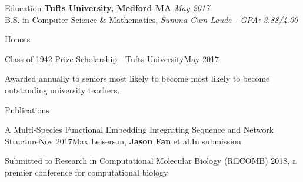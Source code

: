 \documentclass{resume}
\begin{document}
  \begin{rSection}{Education}
    {\bf Tufts University, Medford MA} \hfill {\em May 2017} \\ 
    { B.S. in Computer Science \& Mathematics, \textit{Summa Cum Laude -  GPA: 3.88/4.00}}
  \end{rSection}

  \begin{rSection}{Honors} 
  \begin{rSubsection}{Class of 1942 Prize Scholarship - Tufts University}{May 2017}{}{}
  \item Awarded annually to seniors most likely to become most
likely to become outstanding university teachers.
  \end{rSubsection}
  \end{rSection}

  \begin{rSection}{Publications}
  \begin{rSubsection}{A Multi-Species Functional Embedding Integrating Sequence and Network Structure}{Nov 2017}{Max Leiserson, \textbf{Jason Fan} et al.}{In submission}
  \item Submitted to Research in Computational Molecular Biology (RECOMB) 2018, a premier conference for computational biology
  \end{rSubsection}
  \end{rSection}
\end{document}
